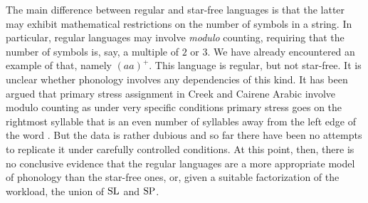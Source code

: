 The main difference between regular and star-free languages is that the latter may exhibit mathematical restrictions on the number of symbols in a string.
In particular, regular languages may involve \emph{modulo} counting, requiring that the number of symbols is, say, a multiple of $2$ or $3$.
We have already encountered an example of that, namely $(aa)^+$.
This language is regular, but not star-free.
It is unclear whether phonology involves any dependencies of this kind.
It has been argued that primary stress assignment in Creek and Cairene Arabic involve modulo counting as under very specific conditions primary stress goes on the rightmost syllable that is an even number of syllables away from the left edge of the word \citep{Graf10PLC33,Graf10thesis}.
But the data is rather dubious and so far there have been no attempts to replicate it under carefully controlled conditions.
At this point, then, there is no conclusive evidence that the regular languages are a more appropriate model of phonology than the star-free ones, or, given a suitable factorization of the workload, the union of $\mathrm{SL}$ and $\mathrm{SP}$.






